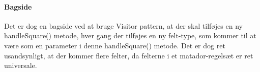 \documentclass[class=article, crop=false]{standalone}
\begin{document}
       \paragraph{Bagside \newline}
        Det er dog en bagside ved at bruge Visitor pattern, at der skal tilføjes en ny handleSquare() metode, hver gang der tilføjes en ny felt-type, som kommer til at være som en parameter i denne handleSquare() metode. Det er dog ret usandsynligt, at der kommer flere felter, da felterne i et matador-regelsæt er ret universale.
\end{document}
